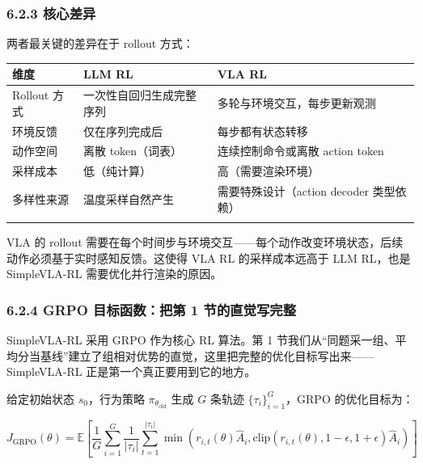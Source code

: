 \documentclass[
  chinese,
]{ctexart}
\begin{document}
\subsubsection{6.2.3 核心差异}\label{ux6838ux5fc3ux5deeux5f02}

两者最关键的差异在于 rollout 方式：

\begin{center}
\begin{tabular}{@{}>{\raggedright\arraybackslash}p{} >{\raggedright\arraybackslash}p{} >{\raggedright\arraybackslash}p{}@{}}
\toprule\noalign{}
维度 & LLM RL & VLA RL \\
\midrule\noalign{}
Rollout 方式 & 一次性自回归生成完整序列 & 多轮与环境交互，每步更新观测 \\
环境反馈 & 仅在序列完成后 & 每步都有状态转移 \\
动作空间 & 离散 token（词表） & 连续控制命令或离散 action token \\
采样成本 & 低（纯计算） & 高（需要渲染环境） \\
多样性来源 & 温度采样自然产生 & 需要特殊设计（action decoder 类型依赖） \\
\bottomrule\noalign{}
\end{tabular}
\end{center}

VLA 的 rollout
需要在每个时间步与环境交互------每个动作改变环境状态，后续动作必须基于实时感知反馈。这使得
VLA RL 的采样成本远高于 LLM RL，也是 SimpleVLA-RL
需要优化并行渲染的原因。

\subsubsection{6.2.4 GRPO 目标函数：把第 1
节的直觉写完整}\label{grpo-ux76eeux6807ux51fdux6570ux628aux7b2c-1-ux8282ux7684ux76f4ux89c9ux5199ux5b8cux6574}

SimpleVLA-RL 采用 GRPO 作为核心 RL 算法。第 1
节我们从``同题采一组、平均分当基线''建立了组相对优势的直觉，这里把完整的优化目标写出来------SimpleVLA-RL
正是第一个真正要用到它的地方。

给定初始状态 \(s_0\)，行为策略 \(\pi_{\theta_{\text{old}}}\) 生成 \(G\)
条轨迹 \(\{\tau_i\}_{i=1}^G\)，GRPO 的优化目标为：

\[
J_{\text{GRPO}}(\theta) = \mathbb{E} \left[ \frac{1}{G} \sum_{i=1}^G \frac{1}{|\tau_i|} \sum_{t=1}^{|\tau_i|} \min\left( r_{i,t}(\theta) \hat{A}_i, \text{clip}(r_{i,t}(\theta), 1-\epsilon, 1+\epsilon) \hat{A}_i \right) \right]
\]
\end{document}
